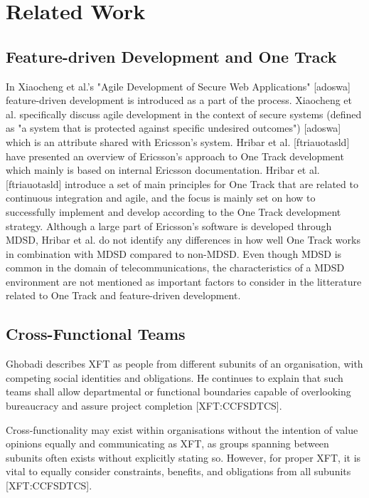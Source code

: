 \documentclass[fina_report_innit.tex]{subfiles}
\begin{document}
\section{Related Work}


\subsection*{Feature-driven Development and One Track}
In Xiaocheng et al.'s "Agile Development of Secure Web Applications" [adoswa] feature-driven development is introduced as a part of the process. Xiaocheng et al. specifically discuss agile development in the context of secure systems (defined as "a system that is protected against specific undesired outcomes") [adoswa] which is an attribute shared with Ericsson's system. Hribar et al. [ftriauotasld] have presented an overview of Ericsson's approach to One Track development which mainly is based on internal Ericsson documentation. Hribar et al. [ftriauotasld] introduce a set of main principles for One Track that are related to continuous integration and agile, and the focus is mainly set on how to successfully implement and develop according to the One Track development strategy. Although a large part of Ericsson's software is developed through MDSD, Hribar et al. do not identify any differences in how well One Track works in combination with MDSD compared to non-MDSD. Even though MDSD is common in the domain of telecommunications, the characteristics of a MDSD environment are not mentioned as important factors to consider in the litterature related to One Track and feature-driven development. 

\subsection*{Cross-Functional Teams}
Ghobadi describes XFT as people from different subunits of an organisation, with competing social identities and obligations. He continues to explain that such teams shall allow departmental or functional boundaries capable of overlooking bureaucracy and assure project completion [XFT:CCFSDTCS].

Cross-functionality may exist within organisations without the intention of value opinions equally and communicating as XFT, as groups spanning between subunits often exists without explicitly stating so. However, for proper XFT, it is vital to equally consider constraints, benefits, and obligations from all subunits [XFT:CCFSDTCS].
\end{document}
